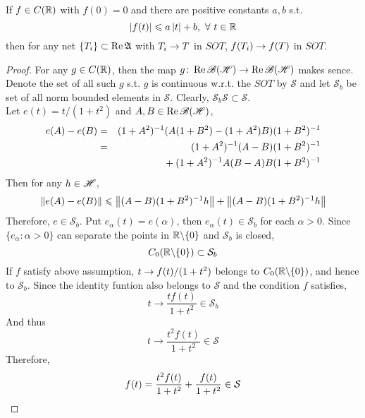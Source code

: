 \documentclass[a4paper,11pt]{report}
\begin{document}
\begin{lem}
	If $f \in C(\mathbb{R})$ with $f(0)=0$ and there are positive constants $a,b$ s.t. 
	\begin{equation*}
		\left\lvert f(t)\right\lvert \leqslant a\left\lvert t\right\lvert + b,~ \forall~ t \in \mathbb{R}
	\end{equation*}
	then for any net $\{T_i\} \subset \operatorname{Re}{\mathfrak{A}}$ with $T_i \rightarrow T$ in $SOT$, $f(T_i) \rightarrow f(T)$ in $SOT$.
\end{lem}
\begin{proof}
	For any $g \in C(\mathbb{R})$, then the map $g \colon \operatorname{Re}{\mathscr{B(H)}} \rightarrow \operatorname{Re}{\mathscr{B(H)}}$ makes sence. Denote the set of all such $g$ s.t. $g$ is continuous w.r.t. the $SOT$ by $\mathcal{S}$ and let $\mathcal{S}_b$ be set of all norm bounded elements in $\mathcal{S}$. Clearly, $\mathcal{S}_b \mathcal{S} \subset \mathcal{S}$.\\
	Let $e(t) = t / (1+t^2)$ and $A,B \in \operatorname{Re}{\mathscr{B(H)}}$,
	\begin{eqnarray*}
		e(A)-e(B) &=& (1+A^2)^{-1}(A(1+B^2)-(1+A^2)B)(1+B^2)^{-1} \\
		&=& (1+A^2)^{-1}(A-B)(1+B^2)^{-1} \\
		&& \negmedspace{} + (1+A^2)^{-1}A(B-A)B(1+B^2)^{-1}
	\end{eqnarray*}
	Then for any $h \in \mathscr{H}$,
	\begin{equation*}
		\left\lVert e(A)-e(B)\right\lVert \leqslant \left\lVert(A-B)(1+B^2)^{-1}h\right\lVert + \left\lVert(A-B)(1+B^2)^{-1}h\right\lVert
	\end{equation*}
	Therefore, $e \in \mathcal{S}_b$. Put $e_{\alpha}(t) = e(\alpha)$, then $e_{\alpha}(t) \in \mathcal{S}_b$ for each $\alpha > 0$. Since $\{e_{\alpha} \colon \alpha > 0\}$ can separate the points in $\mathbb{R} \backslash \{0\}$ and $\mathcal{S}_b$ is closed,
	\begin{equation*}
		C_0(\mathbb{R} \backslash \{0\}) \subset \mathcal{S}_b
	\end{equation*}
	If $f$ satisfy above assumption, $t \rightarrow f(t) / (1+t^2)$ belongs to $C_0(\mathbb{R} \backslash \{0\})$, and hence to $\mathcal{S}_b$. Since the identity funtion also belongs to $\mathcal{S}$ and the condition $f$ satisfies,
	\begin{equation*}
		t \longrightarrow \frac{tf(t)}{1+t^2} \in \mathcal{S}_b
	\end{equation*}
	And thus 
	\begin{equation*}
		t \longrightarrow \frac{t^2f(t)}{1+t^2} \in \mathcal{S}
	\end{equation*}
	Therefore,
	\begin{equation*}
		f(t) = \frac{t^2f(t)}{1+t^2} + \frac{f(t)}{1+t^2} \in \mathcal{S} \qedhere
	\end{equation*}
\end{proof}
\end{document}
